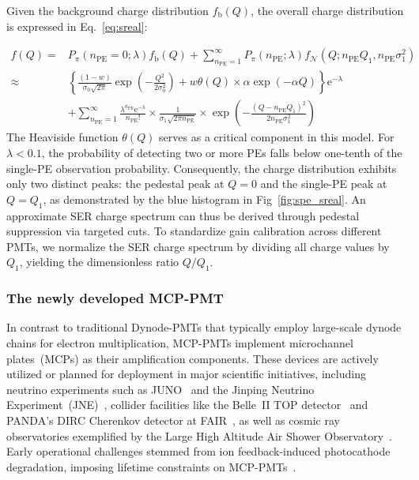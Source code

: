 Given the background charge distribution $ f_{\mathrm{b}}(Q) $, the overall charge distribution is expressed in Eq.~\ref{eq:sreal}:

\begin{equation}
	\begin{aligned}
		f(Q) =  & P_{\pi}(n_{\mathrm{PE}}=0;\lambda)f_{\mathrm{b}}(Q) + \sum_{n_{\mathrm{PE}}=1}^{\infty}P_{\pi}(n_{\mathrm{PE}};\lambda) f_{\mathcal{N}}(Q; n_{\mathrm{PE}}Q_1,n_{\mathrm{PE}}\sigma_1^2) \\
		\approx & \left\{\frac{(1-w)}{\sigma_0 \sqrt{2 \pi}} \exp \left(-\frac{Q^2}{2 \sigma_0^2}\right)
		+w \theta(Q)\times \alpha \exp \left(-\alpha Q\right)\right\} \mathrm{e}^{-\lambda}                                                                                                                \\
		        & +\sum_{n_{\mathrm{PE}}=1}^{\infty} \frac{\lambda^{n_{\mathrm{PE}}} \mathrm{e}^{-\lambda}}{n_{\mathrm{PE}} !}
		\times \frac{1}{\sigma_1 \sqrt{2 \pi n_{\mathrm{PE}}}}\times
		\exp \left(-\frac{\left(Q-n_{\mathrm{PE}} Q_1\right)^2}{2 n_{\mathrm{PE}} \sigma_1^2}\right)
	\end{aligned}
	\label{eq:sreal}
\end{equation}
The Heaviside function $\theta(Q)$ serves as a critical component in this model. For $\lambda < 0.1$, the probability of detecting two or more PEs falls below one-tenth of the single-PE observation probability. Consequently, the charge distribution exhibits only two distinct peaks: the pedestal peak at $Q=0$ and the single-PE peak at $Q=Q_1$, as demonstrated by the blue histogram in Fig~\ref{fig:spe_sreal}.
An approximate SER charge spectrum can thus be derived through pedestal suppression via targeted cuts. To standardize gain calibration across different PMTs, we normalize the SER charge spectrum by dividing all charge values by $Q_1$, yielding the dimensionless ratio $Q/Q_1$.

\subsubsection{The newly developed MCP-PMT}
In contrast to traditional Dynode-PMTs that typically employ large-scale dynode chains for electron multiplication, MCP-PMTs implement microchannel plates~(MCPs) as their amplification components. These devices are actively utilized or planned for deployment in major scientific initiatives, including neutrino experiments such as JUNO~\cite{ZHU2020162002} and the Jinping Neutrino Experiment~(JNE)~\cite{Zhang:2023ued}, collider facilities like the Belle~II TOP detector~\cite{MATSUOKA2014148} and PANDA's DIRC Cherenkov detector at FAIR~\cite{KRAUSS2023168659}, as well as cosmic ray observatories exemplified by the Large High Altitude Air Shower Observatory~\cite{Cao2019UpgradingPT}. Early operational challenges stemmed from ion feedback-induced photocathode degradation, imposing lifetime constraints on MCP-PMTs~\cite{N2006Lifetime}.


